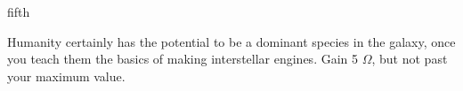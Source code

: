 \documentclass[notebook]{guildcamp1}
\begin{document}
\begin{page}{fifth}

Humanity certainly has the potential to be a dominant species in the galaxy, once you teach them the basics of making interstellar engines.
Gain 5 $\Omega$, but not past your maximum value.

\end{page}

\endnotebook
\end{document}
